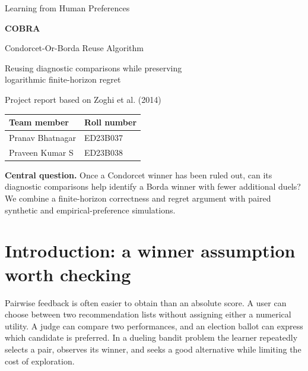 \documentclass[11pt,a4paper]{article}
\begin{document}
\hypersetup{pageanchor=false}\begin{titlepage}\thispagestyle{empty}\centering\vspace*{1.3cm}
{\Large Learning from Human Preferences\par}\vspace{1.2cm}
{\Huge\bfseries COBRA\par}\vspace{.4cm}
{\LARGE Condorcet-Or-Borda Reuse Algorithm\par}\vspace{.7cm}
{\Large Reusing diagnostic comparisons while preserving\\ logarithmic finite-horizon regret\par}\vspace{1.4cm}
{\large Project report based on Zoghi et al. (2014)\par}\vspace{1cm}
\begin{tabular}{ll}\toprule\textbf{Team member}&\textbf{Roll number}\\\midrule Pranav Bhatnagar&ED23B037\\Praveen Kumar S&ED23B038\\\bottomrule\end{tabular}
\vfill
\begin{minipage}{.87\linewidth}\textbf{Central question.} Once a Condorcet winner has been ruled out, can its diagnostic comparisons help identify a Borda winner with fewer additional duels? We combine a finite-horizon correctness and regret argument with paired synthetic and empirical-preference simulations.\end{minipage}
\vfill\end{titlepage}
\hypersetup{pageanchor=true}\thispagestyle{empty}\tableofcontents\clearpage{}
\section{Introduction: a winner assumption worth checking}

Pairwise feedback is often easier to obtain than an absolute score. A user can choose between two recommendation lists without assigning either a numerical utility. A judge can compare two performances, and an election ballot can express which candidate is preferred. In a dueling bandit problem the learner repeatedly selects a pair, observes its winner, and seeks a good alternative while limiting the cost of exploration.
\end{document}
